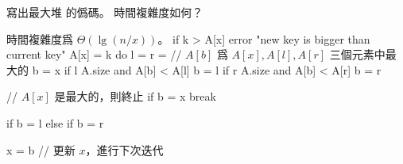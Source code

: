 \startEXERCISE
寫出最大堆  的僞碼。
時間複雜度如何？
\stopEXERCISE

\startANSWER
時間複雜度爲 $\Theta(\lg (n/x))$。
\startCLRSCODE
if k > A[x]
	error "new key is bigger than current key"
A[x] = k
do
	l = 
	r = 
	// $A[b]$ 爲 $A[x],A[l],A[r]$ 三個元素中最大的
	b = x
	if l \le A.size and A[b] < A[l]
		b = l
	if r \le A.size and A[b] < A[r]
		b = r

	// $A[x]$ 是最大的，則終止
	if b = x
		break

	if b = l
	else if b = r

	x = b	// 更新 $x$，進行下次迭代
\stopCLRSCODE
\stopANSWER
